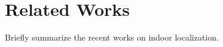 \section{Related Works}
\label{sec:related-works}


Briefly summarize the recent works on indoor localization.



